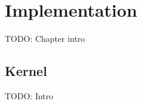 \chapter{Implementation}\label{chap:impl}
TODO: Chapter intro





\section{Kernel}
TODO: Intro











